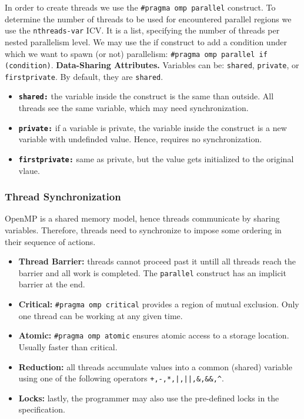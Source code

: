 In order to create threads we use the \texttt{\#pragma omp parallel} construct.
To determine the number of threads to be used for encountered parallel regions we use the \texttt{nthreads-var} ICV.
It is a list, specifying the number of threads per nested parallelism level.
We may use the if construct to add a condition under which we want to spawn (or not) parallelism: \texttt{\#pragma omp parallel if (condition)}.
\textbf{Data-Sharing Attributes.}
Variables can be: \texttt{shared}, \texttt{private}, or \texttt{firstprivate}.
By default, they are \texttt{shared}.
\begin{itemize}
    \item \textbf{\texttt{shared:}} the variable inside the construct is the same than outside. All threads see the same variable, which may need synchronization.
    \item \textbf{\texttt{private:}} if a variable is private, the variable inside the construct is a new variable with undefinded value. Hence, requires no synchronization.
    \item \textbf{\texttt{firstprivate:}} same as private, but the value gets initialized to the original vlaue.
\end{itemize}

\subsubsection{Thread Synchronization}

OpenMP is a shared memory model, hence threads communicate by sharing variables.
Therefore, threads need to synchronize to impose some ordering in their sequence of actions.
\begin{itemize}
    \item \textbf{Thread Barrier:} threads cannot proceed past it untill all threads reach the barrier and all work is completed. The \texttt{parallel} construct has an implicit barrier at the end.
    \item \textbf{Critical:} \texttt{\#pragma omp critical} provides a region of mutual exclusion. Only one thread can be working at any given time.
    \item \textbf{Atomic:} \texttt{\#pragma omp atomic} ensures atomic access to a storage location. Usually faster than critical.
    \item \textbf{Reduction:} all threads accumulate values into a common (shared) variable using one of the following operators \texttt{+,-,*,|,||,\&,\&\&,\^}.
    \item \textbf{Locks:} lastly, the programmer may also use the pre-defined locks in the specification.
\end{itemize}

